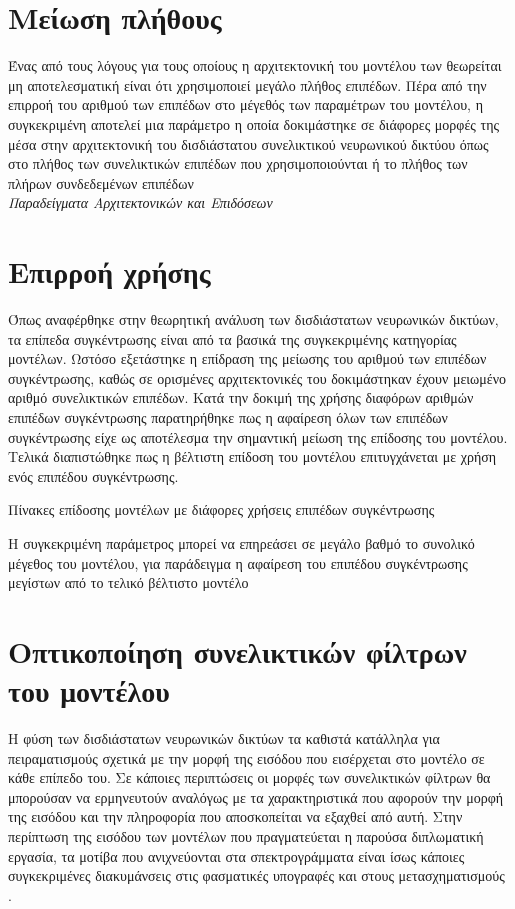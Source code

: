 \section{Μείωση πλήθους }
Ένας από τους λόγους για τους οποίους η αρχιτεκτονική του μοντέλου των  θεωρείται μη αποτελεσματική είναι ότι χρησιμοποιεί μεγάλο πλήθος επιπέδων. Πέρα από την επιρροή του αριθμού των επιπέδων στο μέγεθός των παραμέτρων του μοντέλου, η συγκεκριμένη αποτελεί μια παράμετρο η οποία δοκιμάστηκε σε διάφορες μορφές της μέσα στην αρχιτεκτονική του δισδιάστατου συνελικτικού νευρωνικού δικτύου όπως στο πλήθος των συνελικτικών επιπέδων που χρησιμοποιούνται ή το πλήθος των πλήρων συνδεδεμένων επιπέδων\\

\textit{Παραδείγματα Αρχιτεκτονικών και Επιδόσεων}\\



\section{Επιρροή χρήσης }
Όπως αναφέρθηκε στην θεωρητική ανάλυση των δισδιάστατων νευρωνικών δικτύων, τα επίπεδα συγκέντρωσης είναι από τα βασικά της συγκεκριμένης κατηγορίας μοντέλων. Ωστόσο εξετάστηκε η επίδραση της μείωσης του αριθμού των επιπέδων συγκέντρωσης, καθώς σε ορισμένες αρχιτεκτονικές του δοκιμάστηκαν έχουν μειωμένο αριθμό συνελικτικών επιπέδων. Κατά την δοκιμή της χρήσης διαφόρων αριθμών επιπέδων συγκέντρωσης παρατηρήθηκε πως η αφαίρεση όλων των επιπέδων συγκέντρωσης είχε ως αποτέλεσμα την σημαντική μείωση της επίδοσης του μοντέλου. Τελικά διαπιστώθηκε πως η βέλτιστη επίδοση του μοντέλου επιτυγχάνεται με χρήση ενός επιπέδου συγκέντρωσης.

Πίνακες επίδοσης μοντέλων με διάφορες χρήσεις επιπέδων συγκέντρωσης

Η συγκεκριμένη παράμετρος μπορεί να επηρεάσει σε μεγάλο βαθμό το συνολικό μέγεθος του μοντέλου, για παράδειγμα η αφαίρεση του επιπέδου συγκέντρωσης μεγίστων από το τελικό βέλτιστο μοντέλο

\section{Οπτικοποίηση συνελικτικών φίλτρων του μοντέλου}
Η φύση των δισδιάστατων νευρωνικών δικτύων τα καθιστά κατάλληλα για πειραματισμούς σχετικά με την μορφή της εισόδου που εισέρχεται στο μοντέλο σε κάθε επίπεδο του. Σε κάποιες περιπτώσεις οι μορφές των συνελικτικών φίλτρων θα μπορούσαν να ερμηνευτούν αναλόγως με τα χαρακτηριστικά που αφορούν την μορφή της εισόδου και την πληροφορία που αποσκοπείται να εξαχθεί από αυτή. Στην περίπτωση της εισόδου των μοντέλων που πραγματεύεται η παρούσα διπλωματική εργασία, τα μοτίβα που ανιχνεύονται στα σπεκτρογράμματα είναι ίσως κάποιες συγκεκριμένες διακυμάνσεις στις φασματικές υπογραφές και στους μετασχηματισμούς .

